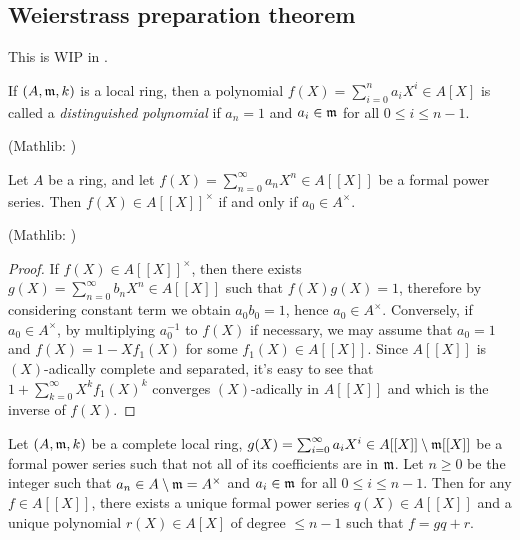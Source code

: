 \subsection{Weierstrass preparation theorem}

This is WIP in .

\begin{definition}
\label{distinguished-polynomial}
\leanok
If $(A,{\mathfrak{m}},k)$ is a local ring, then a polynomial $f(X)=\sum_{i=0}^na_iX^i\in A[X]$
is called a \emph{distinguished polynomial}
if $a_n=1$ and $a_i\in{\mathfrak{m}}$ for all $0\leq i\leq n-1$.

(Mathlib: )
\end{definition}

\begin{prop}
\label{power-series-invertible-iff}
\leanok
Let $A$ be a ring, and let $f(X)=\sum_{n=0}^\infty a_nX^n\in A[[X]]$
be a formal power series.
Then $f(X)\in A[[X]]^\times$ if and only if $a_0\in A^\times$.

(Mathlib: )
\end{prop}

\begin{proof}
\leanok
If $f(X)\in A[[X]]^\times$,
then there exists $g(X)=\sum_{n=0}^\infty b_nX^n\in A[[X]]$
such that $f(X)g(X)=1$, therefore by considering constant term we obtain
$a_0b_0=1$, hence $a_0\in A^\times$.
Conversely, if $a_0\in A^\times$, by multiplying $a_0^{-1}$ to $f(X)$
if necessary, we may assume that $a_0=1$
and $f(X)=1-Xf_1(X)$ for some $f_1(X)\in A[[X]]$.
Since $A[[X]]$ is $(X)$-adically complete and separated,
it's easy to see that $1+\sum_{k=0}^\infty X^kf_1(X)^k$
converges $(X)$-adically in $A[[X]]$ and which is the inverse of
$f(X)$.
\end{proof}

\begin{prop}
\label{weierstrass-division}
\leanok
Let $(A,{\mathfrak{m}},k)$ be a complete local ring,
$g(X)=\sum_{i=0}^\infty a_iX^i\in A[[X]]\setminus{\mathfrak{m}}[[X]]$ be a formal power series
such that not all of its coefficients are in ${\mathfrak{m}}$.
Let $n\geq 0$ be the integer such that $a_n\in A\setminus{\mathfrak{m}}=A^\times$
and $a_i\in{\mathfrak{m}}$ for all $0\leq i\leq n-1$.
Then for any $f\in A[[X]]$,
there exists a unique formal power series
$q(X)\in A[[X]]$ and a unique polynomial $r(X)\in A[X]$ of degree $\leq n-1$
such that $f=gq+r$.
\end{prop}

